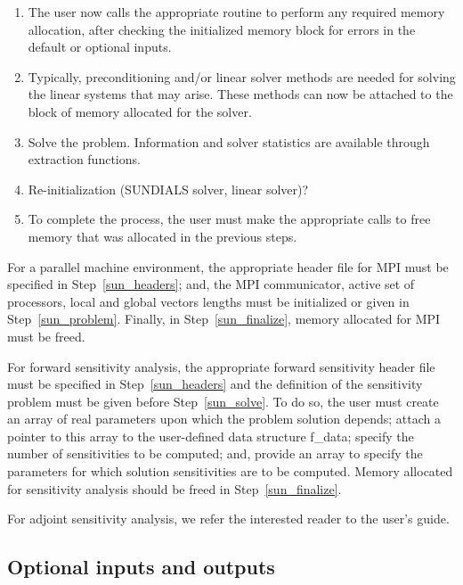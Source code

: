 \begin{enumerate}
\item \label{sun_malloc}
The user now calls the appropriate routine to perform any required
memory allocation, after checking the initialized memory block for
errors in the default or optional inputs.

\item \label{sun_linear}
Typically, preconditioning and/or linear solver methods are needed for
solving the linear systems that may arise. These methods can now be
attached to the block of memory allocated for the solver.

\item \label{sun_solve}
Solve the problem. Information and solver statistics are available
through extraction functions.

\item \label{sun_reinit}
Re-initialization (SUNDIALS solver, linear solver)?

\item \label{sun_finalize}
To complete the process, the user must make the appropriate calls to
free memory that was allocated in the previous steps.

\end{enumerate}

For a parallel machine environment, the appropriate header file for
MPI must be specified in Step~\ref{sun_headers}; and, the MPI communicator,
active set of processors, local and global vectors lengths must be
initialized or given in Step~\ref{sun_problem}. Finally, in
Step~\ref{sun_finalize}, memory allocated for MPI must be freed.

For forward sensitivity analysis, the appropriate forward sensitivity
header file must be specified in Step~\ref{sun_headers} and the
definition of the sensitivity problem must be given before
Step~\ref{sun_solve}. To do so, the user must create an array of
real parameters upon which the problem solution depends; attach a pointer to
this array to the user-defined data structure f\_data; specify the
number of sensitivities to be computed; and, provide an array to
specify the parameters for which solution sensitivities are to be
computed. Memory allocated for sensitivity analysis should be freed in
Step~\ref{sun_finalize}.

{\sf For adjoint sensitivity analysis, we refer the interested reader to
the user's guide.}

\subsection{Optional inputs and outputs}\label{ss:optional_io}

